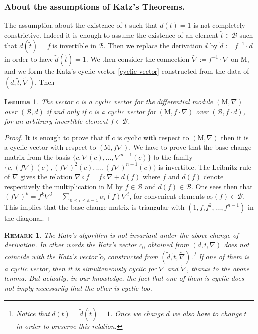 \documentclass{compositio}
\newtheorem{lemma}[theorem]{Lemma}
\newtheorem{remark}[theorem]{\textsc{Remark}}
\numberwithin{equation}{section}
\begin{document}
\subsubsection{About the assumptions of Katz's Theorems.} 
The assumption about the existence of $t$ such that $d(t)=1$ is not completely 
constrictive. 
Indeed it is enough to assume the existence of an element $\widetilde{t}\in\mathscr{B}$ such that 
$d(\widetilde{t})=f$ is invertible in $\mathscr{B}$. Then we replace the derivation 
$d$ by $\widetilde{d}:=f^{-1}\cdot d$ in order to have $\widetilde{d}(\widetilde{t})=1$. 
We then consider the connection $\widetilde{\nabla}:=f^{-1}\cdot\nabla$ on ${\mathrm{M}}$, and 
we form the Katz's cyclic vector \eqref{cyclic vector} constructed from the data of 
$(\widetilde{d},\widetilde{t},\widetilde{\nabla})$. Then
\begin{lemma}\label{change of derivation}
The vector $c$ is a cyclic vector for the differential module $({\mathrm{M}},\nabla)$ over $(\mathscr{B},d)$ if and only if $c$ 
is a cyclic vector for  $({\mathrm{M}},f\cdot\nabla)$ over $(\mathscr{B},f\cdot d)$, for an arbitrary invertible element 
$f\in\mathscr{B}$.
\end{lemma}
\begin{proof}
It is enough to prove that if $c$ is cyclic with respect to $({\mathrm{M}},\nabla)$ then it is a cyclic vector with respect to 
$({\mathrm{M}},f\nabla)$. We have to prove that the base change matrix from the basis $\{c,\nabla(c),\ldots,\nabla^{n-1}(c)\}$ 
to the family $\{c,(f\nabla)(c),(f\nabla)^2(c),\ldots,(f\nabla)^{n-1}(c)\}$ is invertible. The Leibnitz rule of 
$\nabla$ gives the relation $\nabla\circ f=f\circ\nabla+d(f)$ where $f$ and $d(f)$ denote 
respectively the multiplication in ${\mathrm{M}}$ by $f\in{\mathscr{B}}$ and $d(f)\in{\mathscr{B}}$.
One sees then that $(f\nabla)^k=f^k\nabla^k+\sum_{0\leq i\leq k-1}\alpha_i(f)\nabla^i$, for convenient elements 
$\alpha_i(f)\in{\mathscr{B}}$. This implies that the base change matrix is triangular with $(1,f,f^2,\ldots,f^{n-1})$ in the 
diagonal.
\end{proof}

\begin{remark} 
The Katz's algorithm is not invariant under the above change of derivation. 
In other words the Katz's vector $c_0$ obtained from $(d,t,\nabla)$ does not 
coincide with the Katz's vector $\widetilde{c}_0$ constructed from 
$(\widetilde{d},\widetilde{t},\widetilde{\nabla})$.\footnote{Notice that 
$d(t)=\widetilde{d}(\widetilde{t})=1$. Once we change $d$ we also have to change $t$ in order to 
preserve  this relation.} 
If one of them is a cyclic vector, then it is simultaneously 
cyclic for $\nabla$ and $\widetilde{\nabla}$, thanks to the above lemma. 
But actually, in our knowledge, the fact that one of them is cyclic does 
not imply necessarily that the other is cyclic too.  
\end{remark}
\end{document}

